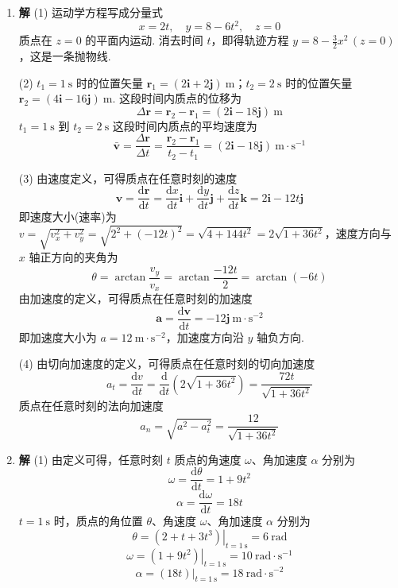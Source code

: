 \begin{enumerate}
\item[L1-5]
\textbf{解} \quad (1) 运动学方程写成分量式
\[
x = 2t, \quad y = 8 - 6t^2, \quad z = 0
\]
质点在 $z = 0$ 的平面内运动. 消去时间 $t$，即得轨迹方程 $y = 8 - \frac{3}{2}x^2 \, (z=0)$，这是一条抛物线.

(2) $t_1 = 1\mathrm{\ s}$ 时的位置矢量 $\boldsymbol{r}_1 = (2\boldsymbol{i} + 2\boldsymbol{j})\mathrm{\ m}$；$t_2 = 2\mathrm{\ s}$ 时的位置矢量 $\boldsymbol{r}_2 = (4\boldsymbol{i} - 16\boldsymbol{j})\mathrm{\ m}$. 这段时间内质点的位移为
\[
\Delta\boldsymbol{r} = \boldsymbol{r}_2 - \boldsymbol{r}_1 = (2\boldsymbol{i} - 18\boldsymbol{j})\mathrm{\ m}
\]
$t_1 = 1\mathrm{\ s}$ 到 $t_2 = 2\mathrm{\ s}$ 这段时间内质点的平均速度为
\[
\bar{\boldsymbol{v}} = \frac{\Delta\boldsymbol{r}}{\Delta t} = \frac{\boldsymbol{r}_2 - \boldsymbol{r}_1}{t_2 - t_1} = (2\boldsymbol{i} - 18\boldsymbol{j})\mathrm{\ m \cdot s^{-1}}
\]

(3) 由速度定义，可得质点在任意时刻的速度
\[
\boldsymbol{v} = \frac{\mathrm{d}\boldsymbol{r}}{\mathrm{d}t} = \frac{\mathrm{d}x}{\mathrm{d}t}\boldsymbol{i} + \frac{\mathrm{d}y}{\mathrm{d}t}\boldsymbol{j} + \frac{\mathrm{d}z}{\mathrm{d}t}\boldsymbol{k} = 2\boldsymbol{i} - 12t\boldsymbol{j}
\]
即速度大小(速率)为 $v = \sqrt{v_x^2 + v_y^2} = \sqrt{2^2 + (-12t)^2} = \sqrt{4 + 144t^2} = 2\sqrt{1 + 36t^2}$，速度方向与 $x$ 轴正方向的夹角为
\[
\theta = \arctan \frac{v_y}{v_x} = \arctan \frac{-12t}{2} = \arctan(-6t)
\]
由加速度的定义，可得质点在任意时刻的加速度
\[
\boldsymbol{a} = \frac{\mathrm{d}\boldsymbol{v}}{\mathrm{d}t} = -12\boldsymbol{j} \mathrm{\ m \cdot s^{-2}}
\]
即加速度大小为 $a = 12 \mathrm{\ m \cdot s^{-2}}$，加速度方向沿 $y$ 轴负方向.

(4) 由切向加速度的定义，可得质点在任意时刻的切向加速度
\[
a_t = \frac{\mathrm{d}v}{\mathrm{d}t} = \frac{\mathrm{d}}{\mathrm{d}t}\left( 2\sqrt{1 + 36t^2} \right) = \frac{72t}{\sqrt{1 + 36t^2}}
\]
质点在任意时刻的法向加速度
\[
a_n = \sqrt{a^2 - a_t^2} = \frac{12}{\sqrt{1 + 36t^2}}
\]

\item[L1-6]

\textbf{解} \quad (1) 由定义可得，任意时刻 $t$ 质点的角速度 $\omega$、角加速度 $\alpha$ 分别为
\[
\omega = \frac{\mathrm{d}\theta}{\mathrm{d}t} = 1 + 9t^2
\]
\[
\alpha = \frac{\mathrm{d}\omega}{\mathrm{d}t} = 18t
\]
$t = 1 \mathrm{\ s}$ 时，质点的角位置 $\theta$、角速度 $\omega$、角加速度 $\alpha$ 分别为
\[
\theta = \left.(2 + t + 3t^3)\right|_{t=1 \mathrm{\ s}} = 6 \mathrm{\ rad}
\]
\[
\omega = \left.(1 + 9t^2)\right|_{t=1 \mathrm{\ s}} = 10 \mathrm{\ rad \cdot s^{-1}}
\]
\[
\alpha = \left.(18t)\right|_{t=1 \mathrm{\ s}} = 18 \mathrm{\ rad \cdot s^{-2}}
\]


\end{enumerate}
